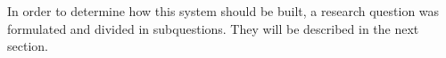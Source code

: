 In order to determine how this system should be built, a research question was formulated and divided in subquestions. They will be described in the next section.




